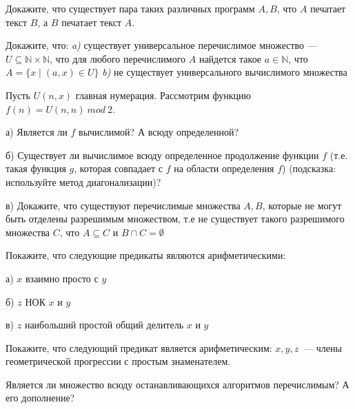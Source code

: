 \setcounter{curtask}{16}


\begin{task}
    Докажите, что существует пара таких различных программ $A, B$, что $A$ печатает
    текст $B$, а $B$ печатает текст $A$.
\end{task}

\begin{task}
    Докажите, что: {\it a)} существует универсальное перечислимое множество ---
    $U \subseteq \mathbb{N} \times \mathbb{N}$, что для любого
    перечислимого $A$ найдется такое $a \in \mathbb{N}$, что $A = \{x
    \mid (a, x) \in U\}$
    {\it b)} не существует универсального вычислимого множества
\end{task}


\begin{task}
    Пусть $U(n, x)$ главная нумерация. Рассмотрим функцию $f(n) = U(n, n)~mod~2$.
    
    а) Является ли $f$ вычислимой? А всюду определенной?

    б) Существует ли вычислимое всюду определенное продолжение функции $f$
    (т.е. такая функция $g$, которая совпадает с $f$ на области определения $f$)
    (подсказка: используйте метод диагонализации)?

    в) Докажите, что существуют перечислимые множества $A, B$, которые не могут быть
    отделены разрешимым множеством, т.е не существует такого разрешимого множества
    $C$, что $A \subseteq C$ и $B \cap C = \emptyset$
\end{task}


\begin{task}
    Покажите, что следующие предикаты являются арифметическими:

    а) $x$ взаимно просто с $y$

    б) $z$ НОК $x$ и $y$

    в) $z$ наибольший простой общий делитель $x$ и $y$
\end{task}

\begin{task}
    Покажите, что следующий предикат является арифметическим: $x, y, z$~--- члены
    геометрической прогрессии с простым знаменателем. 
\end{task}




\breakline


\begin{ptask}{6}
    Является ли множество всюду останавливающихся алгоритмов перечислимым? А его
    дополнение?
\end{ptask}

